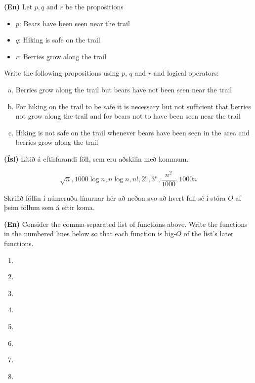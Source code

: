 \documentclass[addpoints]{exam}
\begin{document}
\begin{questions}
\textbf{(En)} Let $p, q$ and $r$ be the propositions

\begin{itemize}
    \item[] $p$: Bears have been seen near the trail
    \item[] $q$: Hiking is safe on the trail
    \item[] $r$: Berries grow along the trail
\end{itemize}

Write the following propositions using $p$, $q$ and $r$ and logical operators:

\begin{enumerate}[a)]
    \item Berries grow along the trail but bears have not been seen near the trail
    \item For hiking on the trail to be safe it is necessary but not sufficient that berries not grow along the trail and for bears not to have been seen near the trail
    \item Hiking is not safe on the trail whenever bears have been seen in the area and berries grow along the trail
\end{enumerate}


\newpage

\question[10] 

\textbf{(Ísl)} Lítið á eftirfarandi föll, sem eru aðskilin með kommum.

\[
\sqrt{n}, 1000\log n, n\log n, n!, 2^n, 3^n, \frac{n^2}{1000}, 1000n
\]

Skrifið föllin í númeruðu línurnar hér að neðan svo að hvert fall sé í stóra $O$ af þeim föllum sem á eftir koma.

\textbf{(En)} Consider the comma-separated list of functions above. Write the functions in the numbered lines below so that each function is big-$O$ of the list's later functions.

\begin{enumerate}
    \item \underline{\hspace{5cm}}
    \item \underline{\hspace{5cm}}
    \item \underline{\hspace{5cm}}
    \item \underline{\hspace{5cm}}
    \item \underline{\hspace{5cm}}
    \item \underline{\hspace{5cm}}
    \item \underline{\hspace{5cm}}
    \item \underline{\hspace{5cm}} 
\end{enumerate}


\end{questions}
\end{document}
